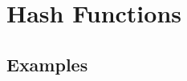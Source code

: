 \section{Hash Functions}
\label{Grelgdnuan_vno_Bleototuh_Lwo_Egerny_BLE}


\subsection{Examples}
\label{Riado_Lyaer_RL}
